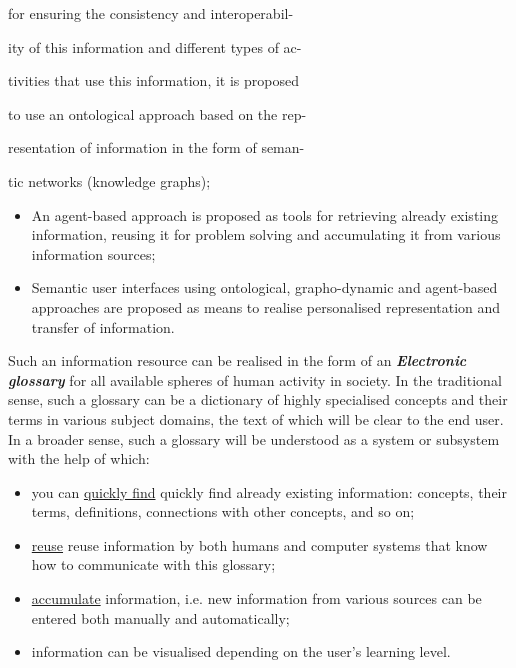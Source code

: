 \documentclass[10 pt]{extarticle}
\begin{document}
\begin{multicols}{2}
\setlength{\parindent}{24pt}
\setlength{\parskip}{0pt}
for ensuring the consistency and interoperabil- \par
ity of this information and different types of ac- \par
tivities that use this information, it is proposed \par
to use an ontological approach based on the rep- \par
resentation of information in the form of seman- \par
tic networks (knowledge graphs);
\setlength{\parindent}{14pt}
\begin{itemize}
    \item  An agent-based approach is proposed as tools for
retrieving already existing information, reusing it for
problem solving and accumulating it from various
information sources;
    \item Semantic user interfaces using ontological, grapho-dynamic and agent-based approaches are proposed
as means to realise personalised representation and
transfer of information.
\end{itemize}
\setlength{\parskip}{3 pt}

    Such an information resource can be realised in the
form of an \textbf{\textit{Electronic glossary}} for all available spheres
of human activity in society. In the traditional sense,
such a glossary can be a dictionary of highly specialised
concepts and their terms in various subject domains, the
text of which will be clear to the end user. In a broader
sense, such a glossary will be understood as a system or
subsystem with the help of which:

\begin{itemize}
    \item you can \underline{quickly find} quickly find already existing information:
concepts, their terms, definitions, connections with
other concepts, and so on;
    \item \setlength{\parskip}{0pt} \underline{reuse} reuse information by both humans and computer
systems that know how to communicate with this
glossary;
    \item \underline{accumulate} information, i.e. new information from
various sources can be entered both manually and
automatically;
    \item information can be visualised depending on the
user’s learning level.
\end{itemize}


\end{multicols}
\end{document}
